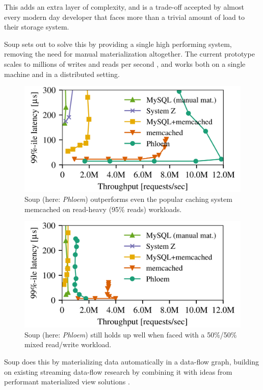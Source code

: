 \documentclass[b5paper]{report}
\begin{document}
This adds an extra layer of complexity, and is a trade-off accepted by almost
every modern day developer that faces more than a trivial amount of load to
their storage system.

Soup sets out to solve this by providing a single high performing system,
removing the need for manual materialization altogether. The current prototype
scales to millions of writes and reads per second \cite{soup}, and works both on
a single machine and in a distributed setting.

\begin{figure}
  \centering
  \includegraphics[width=\textwidth]{read}
  \caption{
    Soup (here: \textit{Phloem}) outperforms even the popular caching
    system memcached on read-heavy (95\% reads) workloads.
  }
\end{figure}

\begin{figure}
  \centering
  \includegraphics[width=\textwidth]{mixed}
  \caption{
    Soup (here: \textit{Phloem}) still holds up well when faced with a 50\%/50\%
    mixed read/write workload.
  }
\end{figure}

Soup does this by materializing data automatically in a data-flow
graph, building on existing streaming data-flow research \cite{naiad, dataflow}
by combining it with ideas from performant materialized view solutions
\cite{dbtoaster, pequod}.
\end{document}
